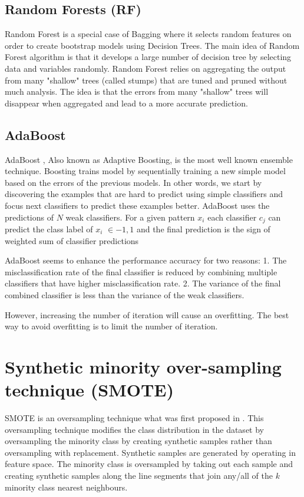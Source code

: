 \documentclass[runningheads,a4paper]{llncs}
\begin{document}
\subsection{Random Forests (RF)}
Random Forest \cite{breiman2001random} is a special case of Bagging where it selects  random features on order to create bootstrap models using Decision Trees. The main idea of Random Forest algorithm is that it develops a large number of decision tree by selecting data and variables randomly.
Random Forest relies on aggregating the output from many "shallow" trees (called stumps) that are tuned and pruned without much analysis. The idea is that the errors from many "shallow" trees will disappear when aggregated and lead to a more accurate prediction.

\subsection{AdaBoost}
AdaBoost \cite{Schapire2013}, Also known as Adaptive Boosting, is the most well known ensemble technique. Boosting trains model by sequentially training a new simple model based on the errors of the previous models. In other words, we start by discovering the examples that are hard to predict using simple classifiers and focus next classifiers to predict these examples better.
AdaBoost uses the predictions of $N$ weak classifiers. For a given pattern $x_i$ each classifier $c_j$ can predict the class label of $x_i$ $\in {-1,1}$ and the final prediction is the sign of weighted sum of classifier predictions

AdaBoost seems to enhance the performance accuracy for two reasons:
1. The misclassification rate of the final classifier is reduced by combining multiple classifiers that have higher misclassification rate.
2.  The variance of the final combined classifier is less than the variance of the weak classifiers.

However, increasing the number of iteration will cause an overfitting. The best way to avoid overfitting is to limit the number of iteration.

\section{Synthetic minority over-sampling technique (SMOTE)}

SMOTE is an oversampling technique what was first proposed in \cite{chawla2002smote}. This oversampling technique modifies the class distribution in the dataset by oversampling the minority class by creating synthetic samples rather than oversampling with replacement. Synthetic samples are generated by operating in feature space.
The minority class is oversampled by taking out each sample and creating synthetic samples along the line segments that join any/all of the $k$ minority class nearest neighbours. 
\end{document}
